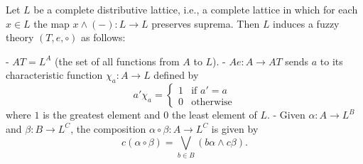 Let $L$ be a complete distributive lattice, i.e., a complete lattice in which for each $x \in L$ the map $x \wedge (-) : L \longrightarrow L$ preserves suprema. Then $L$ induces a fuzzy theory $(T, e, \circ)$ as follows:

- $AT = L^A$ (the set of all functions from $A$ to $L$).
- $Ae : A \longrightarrow AT$ sends $a$ to its characteristic function $\chi_a : A \longrightarrow L$ defined by
  $$a' \chi_a = \begin{cases} 1 & \text{if } a' = a \\ 0 & \text{otherwise} \end{cases}$$
  where $1$ is the greatest element and $0$ the least element of $L$.
- Given $\alpha : A \longrightarrow L^B$ and $\beta : B \longrightarrow L^C$, the composition $\alpha \circ \beta : A \longrightarrow L^C$ is given by
  $$c(\alpha \circ \beta) = \bigvee_{b \in B} (b\alpha \wedge c\beta).$$
